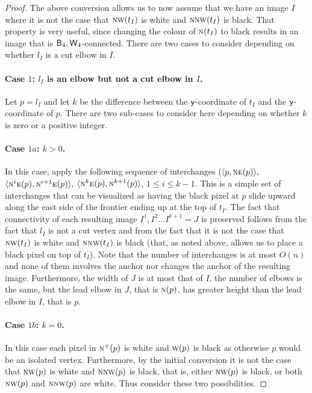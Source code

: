 \documentclass[lotsofwhite,charterfonts]{patmorin}
\newcommand{\fourfour}{\ensuremath{\protect\textup{\textsf{B}}_{4},\protect\textup{\textsf{W}}_{4}}}
\newcommand{\N}{\textsc{n}}
\newcommand{\NE}{\textsc{ne}}
\newcommand{\E}{\textsc{e}}
\newcommand{\W}{\textsc{w}}
\newcommand{\NW}{\textsc{nw}}
\newcommand{\y}{\ensuremath{\protect\textup{\textsf{y}}}}
\newcommand{\ic}[2]{\langle #1,#2 \rangle}
\begin{document}
\begin{proof}
The above conversion allows us to now assume that we have an image $I$
where it is not the case that $\NW(t_{I})$ is white and $\N\NW(t_{I})$
is black. That property is very useful, since changing the colour of
$\N(t_I)$ to black results in an image that is $\fourfour$-connected.
There are two cases to consider depending on whether $l_I$ is a cut
elbow in $I$. 

\paragraph{Case $1$: $l_I$ is an elbow but not a cut elbow in $I$.} 

Let $p=l_I$ and let $k$ be the difference between the \y-coordinate of
$t_I$ and the \y-coordinate of $p$. There are two sub-cases to consider
here depending on whether $k$ is zero or a positive integer. 

\paragraph{Case $1a$: $k>0$.} In this case, apply the following
sequence of interchanges $(\ic{p}{\NE(p)},$
$\ic{\N^i\E(p)}{\N^{i+1}\E(p)},$ $\ic{\N^k\E(p)}{\N^{k+1}(p)}$, $1
\leq i \leq k-1$. This is a simple set of interchanges that can be
visualized as having the black pixel at $p$ slide upward along the east
side of the frontier ending up at the top of $t_I$. The fact that connectivity of each resulting image $I^1, I^2\dots I^{k+1}=J$ is
preserved follows from the fact that $l_I$ is not a cut vertex and
from the fact that it is not the case that  $\NW(t_{I})$ is white and
$\N\NW(t_{I})$ is black (that, as noted above, allows us to place a
black pixel on top of $t_I$). Note that the number of interchanges is
at most $O(n)$ and none of them involves the anchor nor changes the
anchor of the resulting image. Furthermore, the width of $J$ is at
most that of $I$, the number of elbows is the same, but the lead elbow
in $J$, that is $\N(p)$, has greater height than the lead elbow in
$I$, that is $p$.   

\paragraph{Case $1b$: $k=0$.} In this case each pixel in $\N^+(p)$ is
white and $\W(p)$ is black as otherwise $p$ would be an isolated
vertex. Furthermore, by the initial conversion it is not the case that
$\NW(p)$ is white and $\N\NW(p)$ is black, that is, either $\NW(p)$ is
black, or both $\NW(p)$ and $\N\NW(p)$ are white. Thus consider these
two possibilities.


\end{proof}
\end{document}
